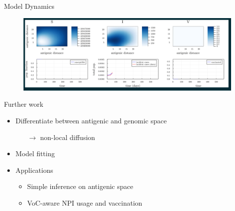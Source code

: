 \documentclass{beamer}
\begin{document}
    



\begin{frame}{Model Dynamics}
    \begin{figure} 
        \includegraphics[width=1.1\textwidth]{2022-07-11-22-45-53.png}
    \end{figure}
\end{frame}


\begin{frame}{Further work}
    \begin{itemize}
        \item Differentiate between antigenic and genomic space
        \begin{itemize}
            \item[$\rightarrow$] non-local diffusion
        \end{itemize}
        \item Model fitting
        \item Applications
        \begin{itemize}
            \item Simple inference on antigenic space
            \item VoC-aware NPI usage and vaccination
        \end{itemize}
    \end{itemize}
\end{frame}
\end{document}

